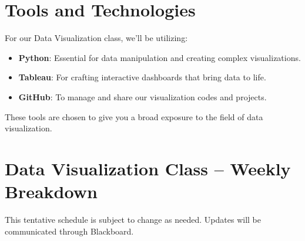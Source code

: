 \documentclass{exam}
\begin{document}
\section*{Tools and Technologies}

For our Data Visualization class, we'll be utilizing:

\begin{itemize}
    \item \textbf{Python}: Essential for data manipulation and creating complex visualizations.
    \item \textbf{Tableau}: For crafting interactive dashboards that bring data to life.
    \item \textbf{GitHub}: To manage and share our visualization codes and projects.
\end{itemize}

These tools are chosen to give you a broad exposure to the field of data visualization.

\section*{Data Visualization Class -- Weekly Breakdown}

This tentative schedule is subject to change as needed. Updates will be communicated through Blackboard.
\end{document}
